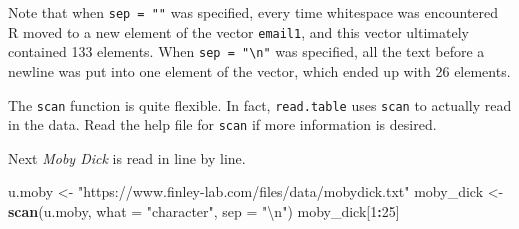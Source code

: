 \documentclass[
]{krantz}
\makeatletter
\newenvironment{Shaded}{\begin{snugshade}}{\end{snugshade}}
\newcommand{\CharTok}[1]{\textcolor[rgb]{0.5,0.5,0.5}{#1}}
\newcommand{\DataTypeTok}[1]{\textcolor[rgb]{0.27,0.27,0.27}{#1}}
\newcommand{\DecValTok}[1]{\textcolor[rgb]{0.06,0.06,0.06}{#1}}
\newcommand{\KeywordTok}[1]{\textcolor[rgb]{0.27,0.27,0.27}{\textbf{#1}}}
\newcommand{\NormalTok}[1]{#1}
\newcommand{\OperatorTok}[1]{\textcolor[rgb]{0.43,0.43,0.43}{\textbf{#1}}}
\newcommand{\StringTok}[1]{\textcolor[rgb]{0.5,0.5,0.5}{#1}}
\newenvironment{kframe}{%
\medskip{}
\setlength{\fboxsep}{.8em}
 \def\at@end@of@kframe{}%
 \ifinner\ifhmode%
  \def\at@end@of@kframe{\end{minipage}}%
  \begin{minipage}{\columnwidth}%
 \fi\fi%
 \def\FrameCommand##1{\hskip\@totalleftmargin \hskip-\fboxsep
 \colorbox{shadecolor}{##1}\hskip-\fboxsep
     \hskip-\linewidth \hskip-\@totalleftmargin \hskip\columnwidth}%
 \MakeFramed {\advance\hsize-\width
   \@totalleftmargin\z@ \linewidth\hsize
   \@setminipage}}%
 {\par\unskip\endMakeFramed%
 \at@end@of@kframe}
\renewenvironment{Shaded}{\begin{kframe}}{\end{kframe}}
\makeatother
\begin{document}
Note that when \texttt{sep\ =\ ""} was specified, every time whitespace was encountered R moved to a new element of the vector \texttt{email1}, and this vector ultimately contained 133 elements. When \texttt{sep\ =\ "\textbackslash{}n"} was specified, all the text before a newline was put into one element of the vector, which ended up with 26 elements.

The \texttt{scan} function is quite flexible. In fact, \texttt{read.table} uses \texttt{scan} to actually read in the data. Read the help file for \texttt{scan} if more information is desired.

Next \emph{Moby Dick} is read in line by line.

\begin{Shaded}
\begin{Highlighting}[]
\NormalTok{u.moby \textless{}{-}}\StringTok{ "https://www.finley{-}lab.com/files/data/mobydick.txt"}
\NormalTok{moby\_dick \textless{}{-}}\StringTok{ }\KeywordTok{scan}\NormalTok{(u.moby, }\DataTypeTok{what =} \StringTok{"character"}\NormalTok{, }\DataTypeTok{sep =} \StringTok{"}\CharTok{\textbackslash{}n}\StringTok{"}\NormalTok{)}
\NormalTok{moby\_dick[}\DecValTok{1}\OperatorTok{:}\DecValTok{25}\NormalTok{]}
\end{Highlighting}
\end{Shaded}
\end{document}
